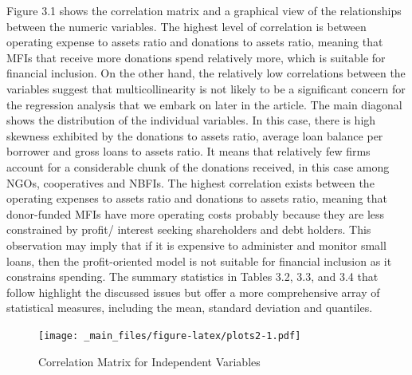 \documentclass[a4paper, nobind]{templates/ociamthesis}
\begin{document}
Figure 3.1 shows the correlation matrix and a graphical view of the relationships between the numeric variables. The highest level of correlation is between operating expense to assets ratio and donations to assets ratio, meaning that MFIs that receive more donations spend relatively more, which is suitable for financial inclusion. On the other hand, the relatively low correlations between the variables suggest that multicollinearity is not likely to be a significant concern for the regression analysis that we embark on later in the article. The main diagonal shows the distribution of the individual variables. In this case, there is high skewness exhibited by the donations to assets ratio, average loan balance per borrower and gross loans to assets ratio. It means that relatively few firms account for a considerable chunk of the donations received, in this case among NGOs, cooperatives and NBFIs. The highest correlation exists between the operating expenses to assets ratio and donations to assets ratio, meaning that donor-funded MFIs have more operating costs probably because they are less constrained by profit/ interest seeking shareholders and debt holders. This observation may imply that if it is expensive to administer and monitor small loans, then the profit-oriented model is not suitable for financial inclusion as it constrains spending. The summary statistics in Tables 3.2, 3.3, and 3.4 that follow highlight the discussed issues but offer a more comprehensive array of statistical measures, including the mean, standard deviation and quantiles.

\newpage
\begin{landscape}

\begin{figure}
\centering
\texttt{[image: \_main\_files/figure-latex/plots2-1.pdf]}
\caption{\label{fig:plots2}Correlation Matrix for Independent Variables}
\end{figure}

\end{landscape}
\end{document}

